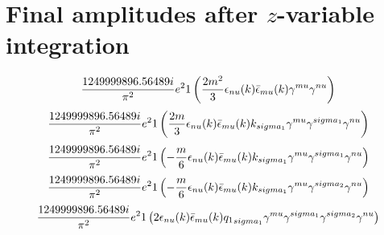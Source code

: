 \section*{Final amplitudes after $z$-variable integration}
\begin{dmath}\frac{1249999896.56489 i}{\pi^{2}} e^{2}1\left(\frac{2 m^{2}}{3} \epsilon_{ \\nu }({ k }) \bar{\epsilon}_{ \\mu }({ k }) { \gamma^{ \\mu } } { \gamma^{ \\nu } }\right)\end{dmath}
\begin{dmath}\frac{1249999896.56489 i}{\pi^{2}} e^{2}1\left(\frac{2 m}{3} \epsilon_{ \\nu }({ k }) \bar{\epsilon}_{ \\mu }({ k }) { { k }_{ \\sigma_1 } } { \gamma^{ \\mu } } { \gamma^{ \\sigma_1 } } { \gamma^{ \\nu } }\right)\end{dmath}
\begin{dmath}\frac{1249999896.56489 i}{\pi^{2}} e^{2}1\left(- \frac{m}{6} \epsilon_{ \\nu }({ k }) \bar{\epsilon}_{ \\mu }({ k }) { { k }_{ \\sigma_1 } } { \gamma^{ \\mu } } { \gamma^{ \\sigma_1 } } { \gamma^{ \\nu } }\right)\end{dmath}
\begin{dmath}\frac{1249999896.56489 i}{\pi^{2}} e^{2}1\left(- \frac{m}{6} \epsilon_{ \\nu }({ k }) \bar{\epsilon}_{ \\mu }({ k }) { { k }_{ \\sigma_1 } } { \gamma^{ \\mu } } { \gamma^{ \\sigma_2 } } { \gamma^{ \\nu } }\right)\end{dmath}
\begin{dmath}\frac{1249999896.56489 i}{\pi^{2}} e^{2}1\left(2 \epsilon_{ \\nu }({ k }) \bar{\epsilon}_{ \\mu }({ k }) { { q_1 }_{ \\sigma_1 } } { \gamma^{ \\mu } } { \gamma^{ \\sigma_1 } } { \gamma^{ \\sigma_2 } } { \gamma^{ \\nu } }\right)\end{dmath}
